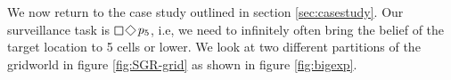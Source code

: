 We now return to the case study outlined in section \ref{sec:casestudy}. Our surveillance task is $\LTLsquare \LTLdiamond p_5$, i.e, we need to infinitely often bring the belief of the target location to 5 cells or lower. We look at two different partitions of the gridworld in figure \ref{fig:SGR-grid} as shown in figure \ref{fig:bigexp}.

\begin{figure}
{}


\end{figure}
